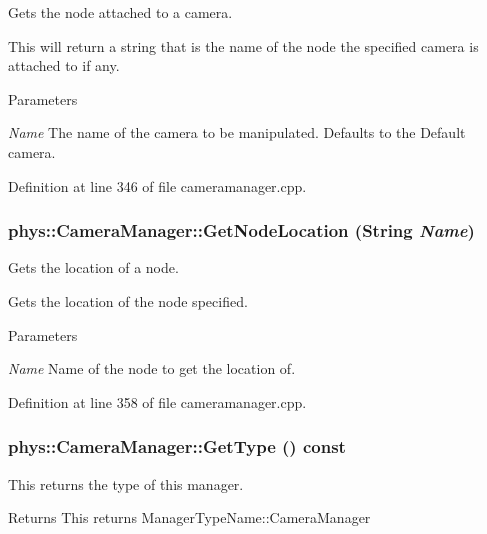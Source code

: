 Gets the node attached to a camera. 

This will return a string that is the name of the node the specified camera is attached to if any. 
\begin{DoxyParams}{Parameters}
\item[{\em Name}]The name of the camera to be manipulated. Defaults to the Default camera. \end{DoxyParams}


Definition at line 346 of file cameramanager.cpp.

\hypertarget{classphys_1_1CameraManager_af5fcec9bebd90b8e98b0d2f4def97ea1}{
\subsubsection[{GetNodeLocation}]{ phys::CameraManager::GetNodeLocation ({\bf String} {\em Name})}}
\label{d9/d91/classphys_1_1CameraManager_af5fcec9bebd90b8e98b0d2f4def97ea1}


Gets the location of a node. 

Gets the location of the node specified. 
\begin{DoxyParams}{Parameters}
\item[{\em Name}]Name of the node to get the location of. \end{DoxyParams}


Definition at line 358 of file cameramanager.cpp.

\hypertarget{classphys_1_1CameraManager_a8412ea634307aa280b615a3cc7c9b739}{
\subsubsection[{GetType}]{ phys::CameraManager::GetType () const}}
\label{d9/d91/classphys_1_1CameraManager_a8412ea634307aa280b615a3cc7c9b739}


This returns the type of this manager. 

\begin{DoxyReturn}{Returns}
This returns ManagerTypeName::CameraManager 
\end{DoxyReturn}


